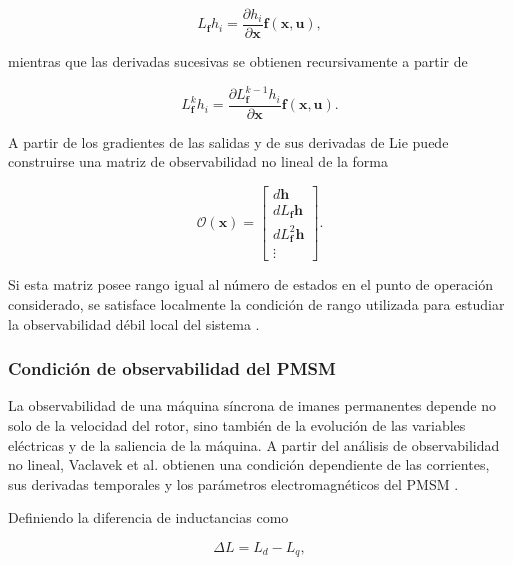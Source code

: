\begin{equation}
    L_{\mathbf{f}}h_i
    =
    \frac{\partial h_i}{\partial \mathbf{x}}
    \mathbf{f}(\mathbf{x},\mathbf{u}),
\end{equation}

mientras que las derivadas sucesivas se obtienen recursivamente a partir de

\begin{equation}
    L_{\mathbf{f}}^{k}h_i
    =
    \frac{\partial L_{\mathbf{f}}^{k-1}h_i}
    {\partial \mathbf{x}}
    \mathbf{f}(\mathbf{x},\mathbf{u}).
\end{equation}

A partir de los gradientes de las salidas y de sus derivadas de Lie puede
construirse una matriz de observabilidad no lineal de la forma

\begin{equation}
    \mathcal{O}(\mathbf{x})
    =
    \begin{bmatrix}
        d\mathbf{h} \\
        dL_{\mathbf{f}}\mathbf{h} \\
        dL_{\mathbf{f}}^{2}\mathbf{h} \\
        \vdots
    \end{bmatrix}.
\end{equation}

Si esta matriz posee rango igual al número de estados en el punto de operación
considerado, se satisface localmente la condición de rango utilizada para estudiar
la observabilidad débil local del sistema
\cite{vaclavekACDriveObservability2013}.

\subsubsection{Condición de observabilidad del PMSM}

La observabilidad de una máquina síncrona de imanes permanentes depende no solo
de la velocidad del rotor, sino también de la evolución de las variables eléctricas
y de la saliencia de la máquina. A partir del análisis de observabilidad no lineal,
Vaclavek et al. obtienen una condición dependiente de las corrientes, sus derivadas
temporales y los parámetros electromagnéticos del PMSM
\cite{vaclavekACDriveObservability2013}.

Definiendo la diferencia de inductancias como

\begin{equation}
    \Delta L = L_d-L_q,
\end{equation}

